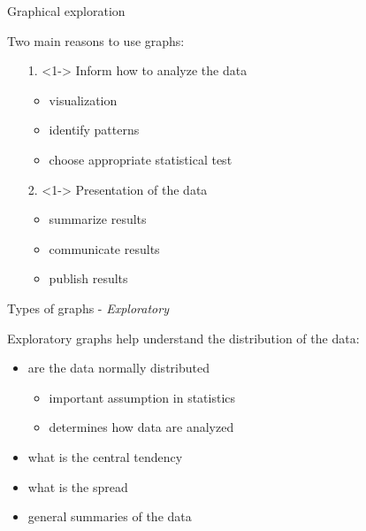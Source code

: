 \documentclass[ignorenonframetext,t]{beamer}
\providecommand{\tightlist}{%
  \setlength{\itemsep}{0pt}\setlength{\parskip}{0pt}}
\begin{document}
\begin{frame}{Graphical exploration}

Two main reasons to use graphs:

\begin{itemize}
\item[1.]<1-> Inform how to analyze the data
  \begin{itemize}
  \item<2-> visualization
  \item<2-> identify patterns
  \item<2-> choose appropriate statistical test
  \end{itemize}
\item[2.]<1-> Presentation of the data
  \begin{itemize}
  \item<3-> summarize results
  \item<3-> communicate results
  \item<3-> publish results
  \end{itemize}
\end{itemize}


\end{frame}

\begin{frame}{Types of graphs - \emph{Exploratory}}

Exploratory graphs help understand the distribution of the data:

\begin{itemize}
\tightlist
\item
  are the data normally distributed

  \begin{itemize}
  \tightlist
  \item
    important assumption in statistics
  \item
    determines how data are analyzed
  \end{itemize}
\item
  what is the central tendency
\item
  what is the spread
\item
  general summaries of the data
\end{itemize}

\end{frame}
\end{document}
